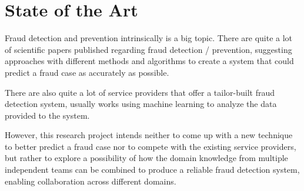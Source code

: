 \section{State of the Art}

  Fraud detection and prevention intrinsically is a big topic. There are quite a lot of scientific papers published regarding fraud detection / prevention, suggesting approaches with different methods and algorithms to create a system that could predict a fraud case as accurately as possible. 

  There are also quite a lot of service providers that offer a tailor-built fraud detection system, usually works using machine learning to analyze the data provided to the system. 
  
  However, this research project intends neither to come up with a new technique to better predict a fraud case nor to compete with the existing service providers, but rather to explore a possibility of how the domain knowledge from multiple independent teams can be combined to produce a reliable fraud detection system, enabling collaboration across different domains.

